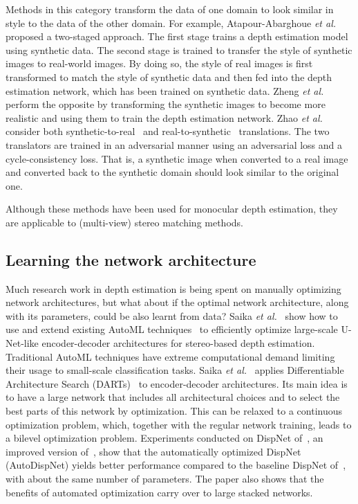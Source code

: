 \documentclass[10pt,journal,compsoc]{IEEEtran}
\newcommand{\etal}{\emph{et al.}}
\begin{document}
Methods in this category transform the data of one domain to look similar in style to the data of the other domain. For example, Atapour-Abarghoue \etal~\cite{Atapour-Abarghouei_2018_CVPR} proposed a two-staged approach.  The first stage  trains a depth estimation model using synthetic data. The second stage is  trained to transfer the style of synthetic  images to real-world images. 	By doing so, the style of real images is first transformed to match the style of synthetic data and then fed into the depth estimation network, which has been trained on synthetic data.  Zheng \etal~\cite{Zheng_2018_ECCV} perform  the opposite by transforming the synthetic images to become more realistic and using them to train the depth estimation network.   Zhao \etal~\cite{Zhao_2019_CVPR} consider both synthetic-to-real~\cite{Zheng_2018_ECCV} and real-to-synthetic~\cite{Kundu_2018_CVPR,Atapour-Abarghouei_2018_CVPR} translations. 
The two translators are trained in an adversarial manner using an adversarial loss and a cycle-consistency loss. That is, a synthetic image when converted to a real image and converted back to  the synthetic domain should look similar to the original one. 




Although these methods have been used for monocular depth estimation, they are applicable to (multi-view) stereo matching methods. 

\subsection{Learning the network architecture}
\label{sec:learning_net_arch}

Much research work in depth estimation is being spent on manually optimizing  network architectures, but what about if the optimal network architecture, along with its parameters, could  be also learnt  from data? Saika \etal~\cite{Saikia_2019_ICCV} show how to use and extend existing AutoML techniques~\cite{hutter2019automated} to efficiently optimize large-scale U-Net-like encoder-decoder architectures for stereo-based depth estimation. Traditional AutoML techniques have extreme computational demand limiting their usage to small-scale classification tasks. Saika \etal~\cite{Saikia_2019_ICCV}   applies Differentiable Architecture Search (DARTs)~\cite{liu2019darts}  to encoder-decoder architectures.  Its main idea is to have a large network that includes all architectural choices and to select the best parts of this network by optimization. This can be relaxed to a continuous optimization problem, which, together with the regular network training, leads to a bilevel optimization problem.  Experiments conducted on DispNet of~\cite{Ilg_2018_ECCV}, an improved version of~\cite{mayer2016large}, show that   the  automatically optimized DispNet (AutoDispNet) yields better performance compared to the  baseline DispNet of~\cite{Ilg_2018_ECCV}, with about the same number of parameters. The paper also shows that  the benefits of automated optimization  carry over to  large stacked networks. 
\end{document}
